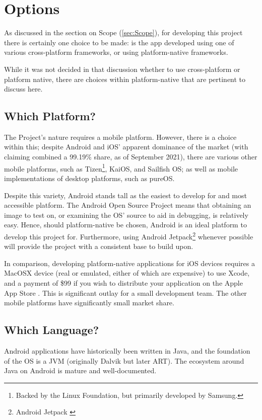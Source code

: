 \documentclass[11pt, a4paper, notitlepage]{report}
\begin{document}
\section{Options}
As discussed in the section on Scope (\ref{sec:Scope}), for developing this 
project there is certainly one choice to be made: is the app developed using 
one of various cross-platform frameworks, or using platform-native frameworks.

While it was not decided in that discussion whether to use cross-platform or platform native, there are choices within platform-native that are pertinent to discuss here.

\subsection{Which Platform?}
The Project's nature requires a mobile platform. However, there is a choice 
within this; despite Android and iOS' apparent dominance of the market (with 
\citet{MobileMarketShare} claiming combined a 99.19\% share, as of September 2021), there are various other mobile platforms, such as Tizen\footnote{Backed by the Linux Foundation, but primarily developed by Samsung.}, KaiOS, and Sailfish OS; as well as mobile implementations of desktop platforms, such as pureOS.

Despite this variety, Android stands tall as the easiest to develop for and 
most accessible platform. The Android Open Source Project means that obtaining 
an image to test on, or examining the OS' source to aid in debugging, is 
relatively easy. Hence, should platform-native be chosen, Android is an ideal platform to develop this project for. Furthermore, using Android Jetpack\footnote{Android Jetpack \citep{AndroidJetpack}} whenever possible will provide the project with a consistent base to build upon.

In comparison, developing platform-native applications for iOS devices requires 
a MacOSX device (real or emulated, either of which are expensive) to use Xcode, and a payment of \$99 if you wish to distribute your application on the Apple App Store \citep{AppleDevProgram}. This is significant outlay for a small development team. The other mobile platforms have significantly small market share.

\subsection{Which Language?}
Android applications have historically been written in Java, and the foundation 
of the OS is a JVM (originally Dalvik but later ART). The ecosystem around Java 
on Android is mature and well-documented.
\end{document}
